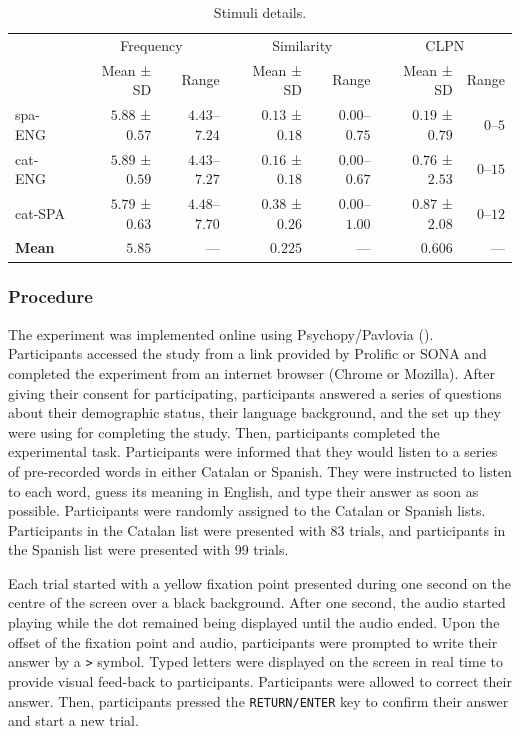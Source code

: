 \documentclass[
]{article}
\begin{document}
\begin{longtable}{l|rrrrrr}

\caption{\label{tbl-stimuli}Stimuli details.}

\tabularnewline

\toprule
\multicolumn{1}{l}{} & \multicolumn{2}{c}{Frequency} & \multicolumn{2}{c}{Similarity} & \multicolumn{2}{c}{CLPN} \\ 
\cmidrule(lr){2-3} \cmidrule(lr){4-5} \cmidrule(lr){6-7}
\multicolumn{1}{l}{} & Mean ± SD & Range & Mean ± SD & Range & Mean ± SD & Range \\ 
\midrule\addlinespace[2.5pt]
spa-ENG & $5.88$ ± $0.57$ & $4.43$–$7.24$ & $0.13$ ± $0.18$ & $0.00$–$0.75$ & $0.19$ ± $0.79$ & $0$–$5$ \\ 
cat-ENG & $5.89$ ± $0.59$ & $4.43$–$7.27$ & $0.16$ ± $0.18$ & $0.00$–$0.67$ & $0.76$ ± $2.53$ & $0$–$15$ \\ 
cat-SPA & $5.79$ ± $0.63$ & $4.48$–$7.70$ & $0.38$ ± $0.26$ & $0.00$–$1.00$ & $0.87$ ± $2.08$ & $0$–$12$ \\ 
\midrule 
\midrule 
\textbf{Mean} & $5.85$ & — & $0.225$ & — & $0.606$ & — \\ 
\bottomrule

\end{longtable}

\subsubsection{Procedure}\label{procedure}

The experiment was implemented online using Psychopy/Pavlovia
(). Participants
accessed the study from a link provided by Prolific or SONA and
completed the experiment from an internet browser (Chrome or Mozilla).
After giving their consent for participating, participants answered a
series of questions about their demographic status, their language
background, and the set up they were using for completing the study.
Then, participants completed the experimental task. Participants were
informed that they would listen to a series of pre-recorded words in
either Catalan or Spanish. They were instructed to listen to each word,
guess its meaning in English, and type their answer as soon as possible.
Participants were randomly assigned to the Catalan or Spanish lists.
Participants in the Catalan list were presented with 83 trials, and
participants in the Spanish list were presented with 99 trials.

Each trial started with a yellow fixation point presented during one
second on the centre of the screen over a black background. After one
second, the audio started playing while the dot remained being displayed
until the audio ended. Upon the offset of the fixation point and audio,
participants were prompted to write their answer by a
\texttt{\textgreater{}} symbol. Typed letters were displayed on the
screen in real time to provide visual feed-back to participants.
Participants were allowed to correct their answer. Then, participants
pressed the \texttt{RETURN/ENTER} key to confirm their answer and start
a new trial.
\end{document}
